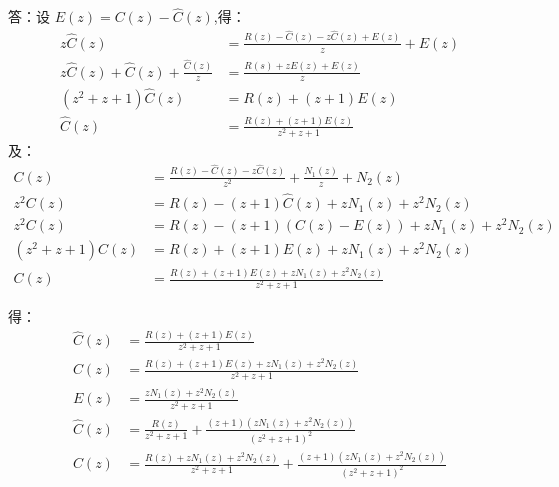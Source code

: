 {\onlyanswer
{
	答：设 $E(z)=C(z)-\hat{C}(z)$,得：
	\begin{align*}
	z\hat{C}(z) &= \frac{R(z)-\hat{C}(z)-z\hat{C}(z)+E(z)}{z}+E(z) \\
	z\hat{C}(z)+\hat{C}(z)+\frac{\hat{C}(z)}{z}&= \frac{R(s)+zE(z)+E(z)}{z}\\
	(z^2+z+1)\hat{C}(z) &=R(z)+(z+1)E(z)\\
	\hat{C}(z) &=\frac{R(z)+(z+1)E(z)}{z^2+z+1}
	\end{align*}
	及：
	\begin{align*}
	C(z) &= \frac{R(z)-\hat{C}(z)-z\hat{C}(z)}{z^2}+\frac{N_1(z)}{z}+N_2(z)\\
	z^2 C(z) &= R(z)-(z+1)\hat{C}(z)+zN_1(z)+z^2 N_2(z)\\
	z^2 C(z) &= R(z)-(z+1)(C(z)-E(z))+zN_1(z)+z^2 N_2(z)\\
	(z^2+z+1) C(z) &= R(z)+(z+1)E(z)+zN_1(z)+z^2 N_2(z)\\
	C(z) &= \frac{R(z)+(z+1)E(z)+zN_1(z)+z^2 N_2(z)}{z^2+z+1}
	\end{align*}
	
	得：
	\begin{align*}
	\hat{C}(z) &=\frac{R(z)+(z+1)E(z)}{z^2+z+1}\\
	C(z) &= \frac{R(z)+(z+1)E(z)+zN_1(z)+z^2 N_2(z)}{z^2+z+1}\\
	E(z) &=\frac{zN_1(z)+z^2 N_2(z)}{z^2+z+1}\\
	\hat{C}(z) &=\frac{R(z)}{z^2+z+1}+\frac{(z+1)(zN_1(z)+z^2 N_2(z))}{(z^2+z+1)^2}\\
	C(z) &= \frac{R(z)+zN_1(z)+z^2 N_2(z)}{z^2+z+1}+\frac{(z+1)(zN_1(z)+z^2 N_2(z))}{(z^2+z+1)^2}
	\end{align*}
	
}
}




